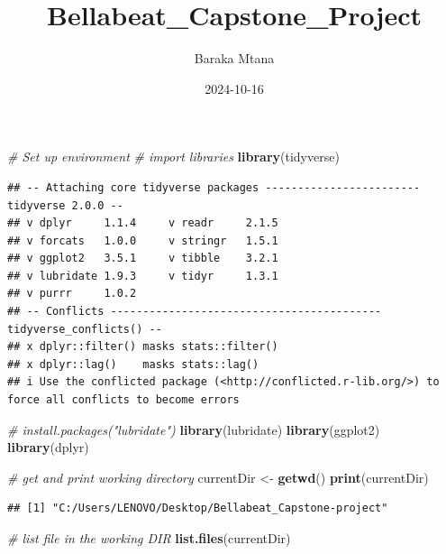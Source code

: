 \documentclass[
]{article}
\title{Bellabeat\_Capstone\_Project}
\author{Baraka Mtana}
\date{2024-10-16}
\newenvironment{Shaded}{\begin{snugshade}}{\end{snugshade}}
\newcommand{\CommentTok}[1]{\textcolor[rgb]{0.56,0.35,0.01}{\textit{#1}}}
\newcommand{\FunctionTok}[1]{\textcolor[rgb]{0.13,0.29,0.53}{\textbf{#1}}}
\newcommand{\NormalTok}[1]{#1}
\newcommand{\OtherTok}[1]{\textcolor[rgb]{0.56,0.35,0.01}{#1}}
\begin{document}
\maketitle

\begin{Shaded}
\begin{Highlighting}[]
\CommentTok{\# Set up environment}
\CommentTok{\# import libraries}
\FunctionTok{library}\NormalTok{(tidyverse)}
\end{Highlighting}
\end{Shaded}

\begin{verbatim}
## -- Attaching core tidyverse packages ------------------------ tidyverse 2.0.0 --
## v dplyr     1.1.4     v readr     2.1.5
## v forcats   1.0.0     v stringr   1.5.1
## v ggplot2   3.5.1     v tibble    3.2.1
## v lubridate 1.9.3     v tidyr     1.3.1
## v purrr     1.0.2     
## -- Conflicts ------------------------------------------ tidyverse_conflicts() --
## x dplyr::filter() masks stats::filter()
## x dplyr::lag()    masks stats::lag()
## i Use the conflicted package (<http://conflicted.r-lib.org/>) to force all conflicts to become errors
\end{verbatim}

\begin{Shaded}
\begin{Highlighting}[]
\CommentTok{\# install.packages("lubridate")}
\FunctionTok{library}\NormalTok{(lubridate)}
\FunctionTok{library}\NormalTok{(ggplot2)}
\FunctionTok{library}\NormalTok{(dplyr)}
\end{Highlighting}
\end{Shaded}

\begin{Shaded}
\begin{Highlighting}[]
\CommentTok{\# get and print working directory}
\NormalTok{currentDir }\OtherTok{\textless{}{-}} \FunctionTok{getwd}\NormalTok{() }
\FunctionTok{print}\NormalTok{(currentDir)}
\end{Highlighting}
\end{Shaded}

\begin{verbatim}
## [1] "C:/Users/LENOVO/Desktop/Bellabeat_Capstone-project"
\end{verbatim}

\begin{Shaded}
\begin{Highlighting}[]
\CommentTok{\# list file in the working DIR}
\FunctionTok{list.files}\NormalTok{(currentDir)}
\end{Highlighting}
\end{Shaded}
\end{document}
